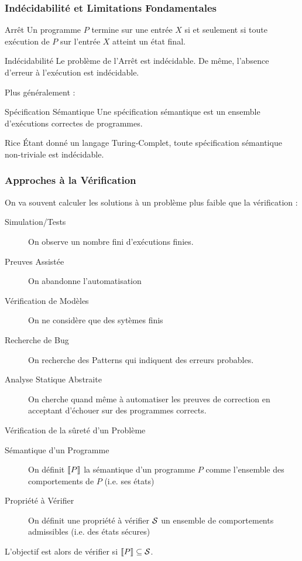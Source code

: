 \documentclass{cours}
\begin{document}
\subsubsection{Indécidabilité et Limitations Fondamentales}
\begin{définition}{Arrêt}{}
Un programme $P$ termine sur une entrée $X$ si et seulement si toute exécution de $P$ sur l'entrée $X$ atteint un état final.
\end{définition}
\begin{théorème}{Indécidabilité}{}
Le problème de l'Arrêt est indécidable. De même, l'absence d'erreur à l'exécution est indécidable.
\end{théorème}
Plus généralement :
\begin{définition}{Spécification Sémantique}{}
Une spécification sémantique est un ensemble d'exécutions correctes de programmes.
\end{définition}
\begin{théorème}{Rice}{}
Étant donné un langage Turing-Complet, toute spécification sémantique non-triviale est indécidable.
\end{théorème}

\subsubsection{Approches à la Vérification}
On va souvent calculer les solutions à un problème plus faible que la vérification :
\begin{description}
	\item[Simulation/Tests] On observe un nombre fini d'exécutions finies.
	\item[Preuves Assistée] On abandonne l'automatisation
	\item[Vérification de Modèles] On ne considère que des sytèmes finis
	\item[Recherche de Bug] On recherche des Patterns qui indiquent des erreurs probables.
	\item[Analyse Statique Abstraite] On cherche quand même à automatiser les preuves de correction en acceptant d'échouer sur des programmes corrects.
\end{description}

\begin{définition}{Vérification de la sûreté d'un Problème}{}
\begin{description}
	\item[Sémantique d'un Programme] On définit $\left\llbracket P \right\rrbracket$ la sémantique d'un programme $P$ comme l'ensemble des comportements de $P$ (i.e. ses états)
	\item[Propriété à Vérifier] On définit une propriété à vérifier $\mathcal{S}$ un ensemble de comportements admissibles (i.e. des états sécures)
\end{description}
L'objectif est alors de vérifier si $\left\llbracket P \right\rrbracket \subseteq \mathcal{S}$.
\end{définition}
\end{document}
